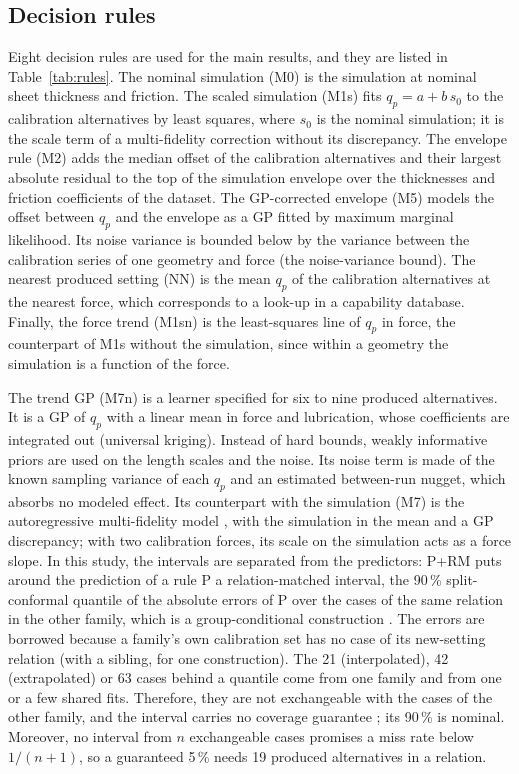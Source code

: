 \documentclass[pdflatex,sn-basic,lineno]{sn-jnl}
\begin{document}
\subsection{Decision rules}\label{sec:rules}

Eight decision rules are used for the main results, and they are listed in Table~\ref{tab:rules}. The nominal simulation (M0) is the simulation at nominal sheet thickness and friction. The scaled simulation (M1s) fits $q_p = a + b\,s_0$ to the calibration alternatives by least squares, where $s_0$ is the nominal simulation; it is the scale term of a multi-fidelity correction without its discrepancy. The envelope rule (M2) adds the median offset of the calibration alternatives and their largest absolute residual to the top of the simulation envelope over the thicknesses and friction coefficients of the dataset. The GP-corrected envelope (M5) models the offset between $q_p$ and the envelope as a GP \citep{rasmussen2006gaussian} fitted by maximum marginal likelihood. Its noise variance is bounded below by the variance between the calibration series of one geometry and force (the noise-variance bound). The nearest produced setting (NN) is the mean $q_p$ of the calibration alternatives at the nearest force, which corresponds to a look-up in a capability database. Finally, the force trend (M1sn) is the least-squares line of $q_p$ in force, the counterpart of M1s without the simulation, since within a geometry the simulation is a function of the force.

The trend GP (M7n) is a learner specified for six to nine produced alternatives. It is a GP of $q_p$ with a linear mean in force and lubrication, whose coefficients are integrated out (universal kriging). Instead of hard bounds, weakly informative priors are used on the length scales and the noise. Its noise term is made of the known sampling variance of each $q_p$ and an estimated between-run nugget, which absorbs no modeled effect. Its counterpart with the simulation (M7) is the autoregressive multi-fidelity model \citep{kennedy2000predicting}, with the simulation in the mean and a GP discrepancy; with two calibration forces, its scale on the simulation acts as a force slope. In this study, the intervals are separated from the predictors: P+RM puts around the prediction of a rule P a relation-matched interval, the 90\,\% split-conformal quantile \citep{lei2018distribution} of the absolute errors of P over the cases of the same relation in the other family, which is a group-conditional construction \citep{vovk2005algorithmic}. The errors are borrowed because a family's own calibration set has no case of its new-setting relation (with a sibling, for one construction). The 21 (interpolated), 42 (extrapolated) or 63 cases behind a quantile come from one family and from one or a few shared fits. Therefore, they are not exchangeable with the cases of the other family, and the interval carries no coverage guarantee \citep{barber2023conformal}; its 90\,\% is nominal. Moreover, no interval from $n$ exchangeable cases promises a miss rate below $1/(n+1)$, so a guaranteed 5\,\% needs 19 produced alternatives in a relation.
\end{document}
